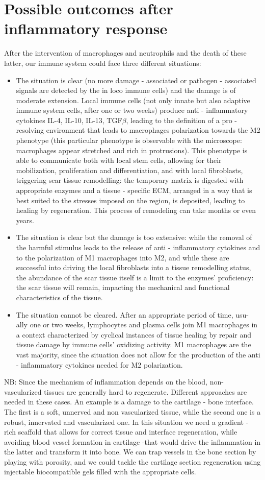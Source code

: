\section{Possible outcomes after inflammatory response}
After the intervention of macrophages and neutrophils and the death of these latter, our immune system could face three different situations:
\begin{itemize}
\item The situation is clear (no more damage - associated or pathogen - associated signals are detected by the in loco immune cells) and the damage is of moderate extension.
Local immune cells (not only innate but also adaptive immune system cells, after one or two weeks) produce anti - inflammatory cytokines IL-4, IL-10, IL-13, TGF$\beta$, leading to the definition of a pro - resolving environment that leads to macrophages polarization towards the M2 phenotype (this particular phenotype is observable with the microscope: macrophages appear stretched and rich in protrusions).
This phenotype is able to communicate both with local stem cells, allowing for their mobilization, proliferation and differentiation, and with local fibroblasts, triggering scar tissue remodelling: the temporary matrix is digested with appropriate enzymes and a tissue - specific ECM, arranged in a way that is best suited to the stresses imposed on the region, is deposited, leading to healing by regeneration. This process of remodeling can take months or even years.
\item The situation is clear but the damage is too extensive: while the removal of the harmful stimulus leads to the release of anti - inflammatory cytokines and to the polarization of M1 macrophages into M2, and while these are successful into driving the local fibroblasts into a tissue remodelling status, the abundance of the scar tissue itself is a limit to the enzymes’ proficiency: the scar tissue will remain, impacting the mechanical and functional characteristics of the tissue.
\item The situation cannot be cleared. After an appropriate period of time, usu- ally one or two weeks, lymphocytes and plasma cells join M1 macrophages in a context characterized by cyclical instances of tissue healing by repair and tissue damage by immune cells’ oxidizing activity. M1 macrophages are the vast majority, since the situation does not allow for the production of the anti - inflammatory cytokines needed for M2 polarization.
\end{itemize}
\noindent
NB: Since the mechanism of inflammation depends on the blood, non-vascularized tissues are generally hard to regenerate. Different approaches are needed in these cases. An example is a damage to the cartilage - bone interface. The first is a soft, unnerved and non vascularized tissue, while the second one is a robust, innervated and vascularized one. In this situation we need a gradient - rich scaffold that allows for correct tissue and interface regeneration, while avoiding blood vessel formation in cartilage -that would drive the inflammation in the latter and transform it into bone. We can trap vessels in the bone section by playing with porosity, and we could tackle the cartilage section regeneration using injectable biocompatible gels filled with the appropriate cells.
